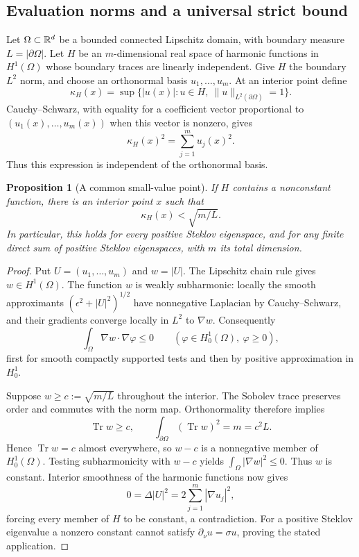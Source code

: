\documentclass[11pt,a4paper]{article}
\newtheorem{proposition}[theorem]{Proposition}
\theoremstyle{definition}\newtheorem{definition}[theorem]{Definition}
\theoremstyle{remark}\newtheorem{remark}[theorem]{Remark}
\begin{document}
\subsection{Evaluation norms and a universal strict bound}

Let $\Omega\subset\mathbb R^d$ be a bounded connected Lipschitz domain, with
boundary measure $L=|\partial\Omega|$. Let $H$ be an $m$-dimensional real
space of harmonic functions in $H^1(\Omega)$ whose boundary traces are
linearly independent. Give $H$ the boundary $L^2$ norm, and choose an
orthonormal basis $u_1,\ldots,u_m$. At an interior point define
\[
 \kappa_H(x)=\sup\{|u(x)|:u\in H,\ \|u\|_{L^2(\partial\Omega)}=1\}.
\]
Cauchy--Schwarz, with equality for a coefficient vector proportional to
$(u_1(x),\ldots,u_m(x))$ when this vector is nonzero, gives
\begin{equation}\label{eq:steklov-evaluation}
 \kappa_H(x)^2=\sum_{j=1}^m u_j(x)^2.
\end{equation}
Thus this expression is independent of the orthonormal basis.

\begin{proposition}[A common small-value point]\label{prop:steklov-universal}
If $H$ contains a nonconstant function, there is an interior point $x$ such
that
\[
 \kappa_H(x)<\sqrt{m/L}.
\]
In particular, this holds for every positive Steklov eigenspace, and for
any finite direct sum of positive Steklov eigenspaces, with $m$ its total
dimension.
\end{proposition}

\begin{proof}
Put $U=(u_1,\ldots,u_m)$ and $w=|U|$. The Lipschitz chain rule gives
$w\in H^1(\Omega)$. The function $w$ is weakly subharmonic: locally the
smooth approximants $(\epsilon^2+|U|^2)^{1/2}$ have nonnegative Laplacian
by Cauchy--Schwarz, and their gradients converge locally in $L^2$ to
$\nabla w$. Consequently
\[
 \int_\Omega\nabla w\cdot\nabla\varphi\leq0
 \qquad(\varphi\in H^1_0(\Omega),\ \varphi\geq0),
\]
first for smooth compactly supported tests and then by positive
approximation in $H^1_0$.

Suppose $w\geq c:=\sqrt{m/L}$ throughout the interior. The Sobolev trace
preserves order and commutes with the norm map. Orthonormality therefore
implies
\[
 \operatorname{Tr}w\geq c,\qquad
 \int_{\partial\Omega}(\operatorname{Tr}w)^2=m=c^2L.
\]
Hence $\operatorname{Tr}w=c$ almost everywhere, so $w-c$ is a nonnegative
member of $H^1_0(\Omega)$. Testing subharmonicity with $w-c$ yields
$\int_\Omega|\nabla w|^2\leq0$. Thus $w$ is constant. Interior smoothness
of the harmonic functions now gives
\[
 0=\Delta|U|^2=2\sum_{j=1}^m|\nabla u_j|^2,
\]
forcing every member of $H$ to be constant, a contradiction.
For a positive Steklov eigenvalue a nonzero constant cannot satisfy
$\partial_\nu u=\sigma u$, proving the stated application.
\end{proof}
\end{document}
